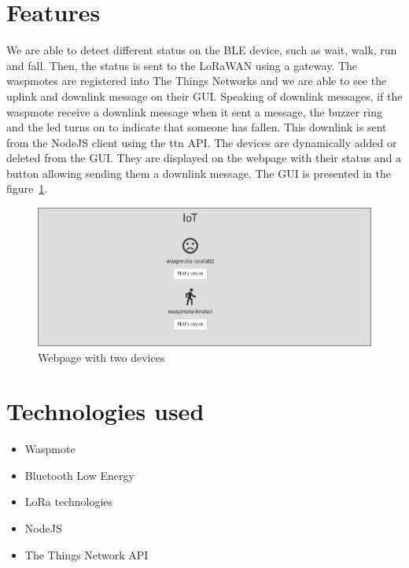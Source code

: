 \documentclass[11pt]{article}
\begin{document}
\section{Features}

We are able to detect different status on the BLE device, such as wait, walk, run and fall. Then, the status is sent to the LoRaWAN using a gateway. The waspmotes are registered into The Things Networks and we are able to see the uplink and downlink message on their GUI. Speaking of downlink messages, if the waspmote receive a downlink message when it sent a message, the buzzer ring and the led turns on to indicate that someone has fallen. This downlink is sent from the NodeJS client using the ttn API. The devices are dynamically added or deleted from the GUI. They are displayed on the webpage with their status and a button allowing sending them a downlink message. The GUI is presented in the figure~\ref{fig:web}.

\begin{figure}[h]
    \centering
    \includegraphics[scale=0.6]{website_image.png}
    \caption{Webpage with two devices}
    \label{fig:web}
\end{figure}


\section{Technologies used}

\begin{itemize}
    \item Waspmote
    \item Bluetooth Low Energy
    \item LoRa technologies
    \item NodeJS
    \item The Things Network API
\end{itemize}
\end{document}
